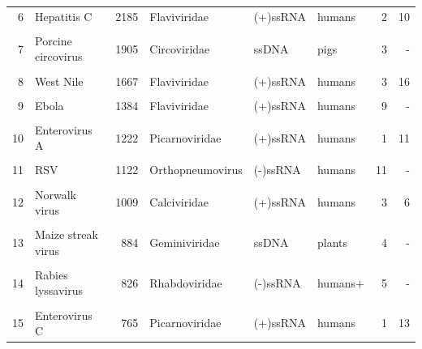 \documentclass[landscape]{slides}
\begin{document}
\begin{slide}
\begin{tabular}{r|l|r|l|l|l|r|r}
  6  & Hepatitis C         &        2185  & Flaviviridae   & (+)ssRNA & humans &     2 & 10       \\ %
     &                     &              &                &          &        &       &          \\ 
  7  & Porcine circovirus  &        1905  & Circoviridae   & ssDNA    & pigs   &     3 & -        \\ %
     &                     &              &                &          &        &       &          \\ 
  \textcolor{myorange}{8}  & \textcolor{myorange}{West Nile}           &        \textcolor{myorange}{1667}  & \textcolor{myorange}{Flaviviridae}   & \textcolor{myorange}{(+)ssRNA} & \textcolor{myorange}{humans} &     \textcolor{myorange}{3} & \textcolor{myorange}{16}       \\ %
     &                     &              &                &          &        &       &          \\ 
  9  & Ebola               &        1384  & Flaviviridae   & (+)ssRNA & humans &     9 & -        \\ %
     &                     &              &                &          &        &       &          \\ 
 10  & Enterovirus A       &        1222  & Picarnoviridae & (+)ssRNA & humans &     1 & 11       \\ %
     &                     &              &                &          &        &       &          \\ 
 11  & RSV                 &        1122  & Orthopneumovirus& (-)ssRNA& humans &    11 & -        \\ %
     &                     &              &                &          &        &       &          \\ 
 12  & Norwalk virus       &        1009  & Calciviridae   & (+)ssRNA & humans &     3 & 6        \\ %
     &                     &              &                &          &        &       &          \\ 
\textcolor{myorange}{13}  & \textcolor{myorange}{Maize streak virus}  &         \textcolor{myorange}{884}  & \textcolor{myorange}{Geminiviridae}  & \textcolor{myorange}{ssDNA}    & \textcolor{myorange}{plants} &     \textcolor{myorange}{4} & \textcolor{myorange}{-}        \\ %
     &                     &              &                &          &        &       &          \\ 
 14  & Rabies lyssavirus   &         826  & Rhabdoviridae  & (-)ssRNA & humans+&     5 & -        \\ %
     &                     &              &                &          &        &       &          \\ 
 15  & Enterovirus C       &         765  & Picarnoviridae & (+)ssRNA & humans &     1 & 13       \\ %
\end{tabular}


\end{slide}
\end{document}
